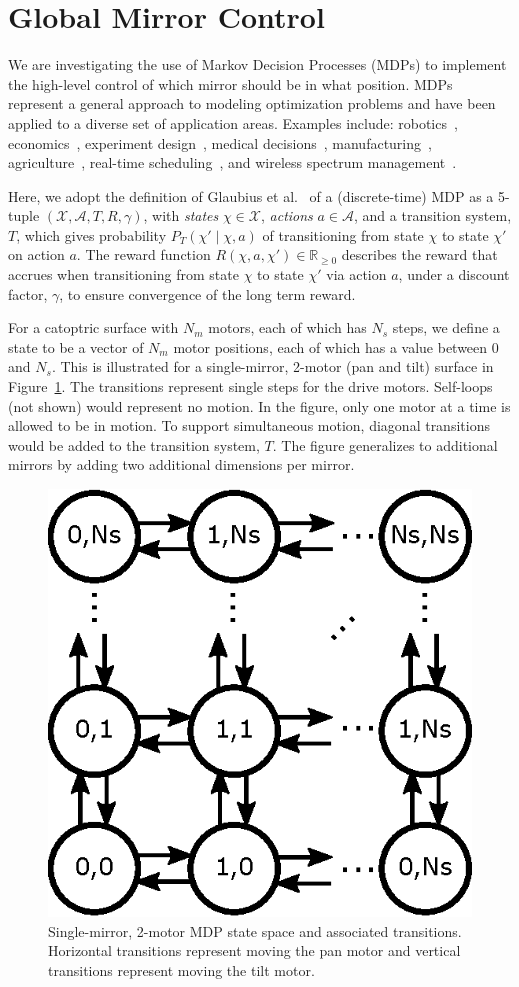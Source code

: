 \section{Global Mirror Control}
\label{sec:mdp}

We are investigating the use of Markov Decision Processes (MDPs) to
implement the high-level control of which mirror should be in what position.
MDPs represent a general approach to modeling optimization
problems and have been applied to a diverse set of
application areas. Examples include: robotics~\cite{ab10},
economics~\cite{bs98}, experiment design~\cite{White93},
medical decisions~\cite{ahsr10}, manufacturing~\cite{yyl04},
agriculture~\cite{Kristensen03},
real-time scheduling~\cite{gtsg08},
and wireless spectrum management~\cite{mgc16}.

Here, we adopt the definition of Glaubius et al.~\cite{gtsg08}
of a (discrete-time) MDP as a 5-tuple
$(\mathcal{X}, \mathcal{A}, T, R, \gamma)$, with \emph{states}
$\chi \in \mathcal{X}$, \emph{actions} $a \in \mathcal{A}$,
and a transition system, $T$, which gives probability
$P_T (\chi' \mid \chi, a)$ of transitioning from state $\chi$ to
state $\chi'$ on action $a$.
The reward function $R(\chi, a, \chi') \in \mathbb R_{\ge 0}$ describes the
reward that accrues when transitioning from state $\chi$ to
state $\chi'$ via action $a$, under a discount factor, $\gamma$,
to ensure convergence of the long term reward.

For a catoptric surface with $N_m$ motors, each of which has $N_s$
steps, we define a state to be a vector of $N_m$ motor positions,
each of which has a value between 0 and $N_s$.  This is illustrated
for a single-mirror, 2-motor (pan and tilt) surface in Figure~\ref{fig:mdp2}.
The transitions represent single steps for the drive motors.
Self-loops (not shown) would represent no motion.  In the figure,
only one motor at a time is allowed to be in motion.  To support simultaneous
motion, diagonal transitions would be added to the transition system, $T$.
The figure generalizes to additional mirrors by adding two
additional dimensions per mirror.

\begin{figure}[ht]
\centering
\includegraphics[width=0.6\columnwidth]{mdp2}
\caption{Single-mirror, 2-motor MDP state space and associated transitions.
Horizontal transitions represent moving the pan motor and vertical transitions
represent moving the tilt motor.}
\label{fig:mdp2}
\end{figure}

